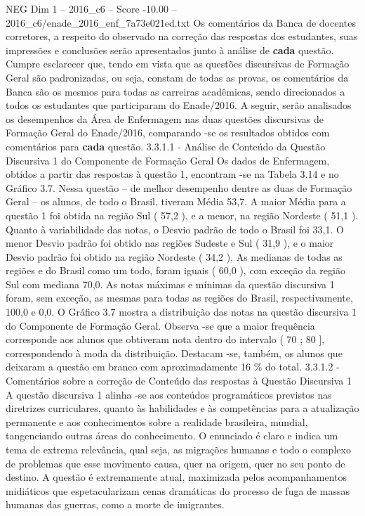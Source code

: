 \begin{textsample}{NEG Dim 1 – 2016\_c6 – Score -10.00 – 2016\_c6/enade\_2016\_enf\_7a73e021ed.txt}
Os comentários da Banca de docentes corretores, a respeito do observado na correção das respostas dos estudantes, suas impressões e conclusões serão apresentados junto à análise de \textbf{cada} questão.
Cumpre esclarecer que, tendo em vista que as questões discursivas de Formação Geral são padronizadas, ou seja, constam de todas as provas, os comentários da Banca são os mesmos para todas as carreiras acadêmicas, sendo direcionados a todos os estudantes que participaram do Enade/2016.
A seguir, serão analisados os desempenhos da Área de Enfermagem nas duas questões discursivas de Formação Geral do Enade/2016, comparando -se os resultados obtidos com comentários para \textbf{cada} questão. 3.3.1.1 - Análise de Conteúdo da Questão Discursiva 1 do Componente de Formação Geral Os dados de Enfermagem, obtidos a partir das respostas à questão 1, encontram -se na Tabela 3.14 e no Gráfico 3.7.
Nessa questão – de melhor desempenho dentre as duas de Formação Geral – os alunos, de todo o Brasil, tiveram Média 53,7.
A maior Média para a questão 1 foi obtida na região Sul ( 57,2 ), e a menor, na região Nordeste ( 51,1 ).
Quanto à variabilidade das notas, o Desvio padrão de todo o Brasil foi 33,1.
O menor Desvio padrão foi obtido nas regiões Sudeste e Sul ( 31,9 ), e o maior Desvio padrão foi obtido na região Nordeste ( 34,2 ).
As medianas de todas as regiões e do Brasil como um todo, foram iguais ( 60,0 ), com exceção da região Sul com mediana 70,0.
As notas máximas e mínimas da questão discursiva 1 foram, sem exceção, as mesmas para todas as regiões do Brasil, respectivamente, 100,0 e 0,0.
O Gráfico 3.7 mostra a distribuição das notas na questão discursiva 1 do Componente de Formação Geral.
Observa -se que a maior frequência corresponde aos alunos que obtiveram nota dentro do intervalo ( 70 ; 80 ], correspondendo à moda da distribuição.
Destacam -se, também, os alunos que deixaram a questão em branco com aproximadamente 16 \% do total. 3.3.1.2 - Comentários sobre a correção de Conteúdo das respostas à Questão Discursiva 1 A questão discursiva 1 alinha -se aos conteúdos programáticos previstos nas diretrizes curriculares, quanto às habilidades e às competências para a atualização permanente e aos conhecimentos sobre a realidade brasileira, mundial, tangenciando outras áreas do conhecimento.
O enunciado é claro e indica um tema de extrema relevância, qual seja, as migrações humanas e todo o complexo de problemas que esse movimento causa, quer na origem, quer no seu ponto de destino.
A questão é extremamente atual, maximizada pelos acompanhamentos midiáticos que espetacularizam cenas dramáticas do processo de fuga de massas humanas das guerras, como a morte de imigrantes.

\end{textsample}
